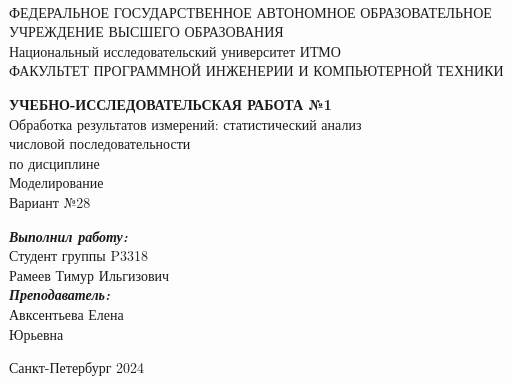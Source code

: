 \documentclass[14pt]{article}
\begin{document}
\begin{spacing}{1}
\begin{center}
	 \\
	\vspace{5mm}
	ФЕДЕРАЛЬНОЕ ГОСУДАРСТВЕННОЕ АВТОНОМНОЕ ОБРАЗОВАТЕЛЬНОЕ \\ УЧРЕЖДЕНИЕ ВЫСШЕГО ОБРАЗОВАНИЯ  \\
	\guillemotleft Национальный исследовательский университет ИТМО\guillemotright \\
	\vspace{5mm}
	ФАКУЛЬТЕТ ПРОГРАММНОЙ ИНЖЕНЕРИИ И КОМПЬЮТЕРНОЙ ТЕХНИКИ
	\vspace{60mm}
	
	{\bf \Large УЧЕБНО-ИССЛЕДОВАТЕЛЬСКАЯ РАБОТА №1} \\
	{ \large 
		\guillemotleft Обработка результатов измерений: статистический анализ \\
		числовой последовательности \guillemotright \\
		по дисциплине \\
		\guillemotleft Моделирование \guillemotright \\
		Вариант №28 \\
	}
\end{center}
\vspace{50mm}

\begin{flushright}
	{\it \textbf{Выполнил работу:}}\\
	Студент группы P3318 \\
	Рамеев Тимур Ильгизович \\
	{\it \textbf{Преподаватель:}}\\
	Авксентьева Елена\\
	Юрьевна\\
\end{flushright}
\vspace{5mm}
\end{spacing}
\begin{center}
    Санкт-Петербург  2024
\end{center}

\newpage
\begin{center}
	\tableofcontents 
\end{center}
\setcounter{page}{1}

\sloppy
\end{document}
